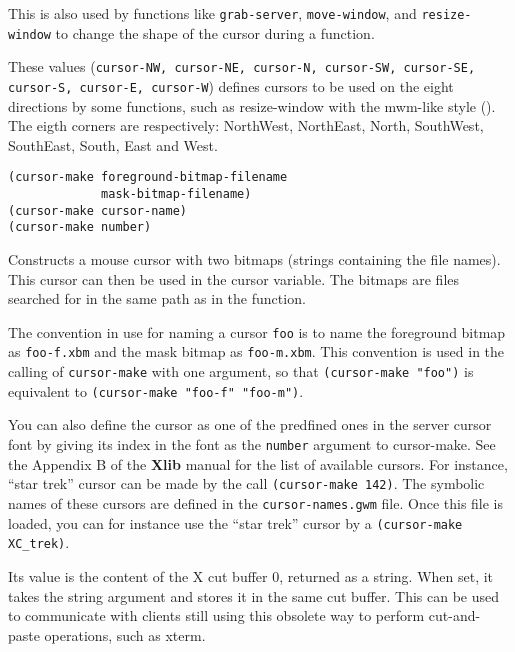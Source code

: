 This is also used by functions like \verb"grab-server", \verb"move-window",
and \verb"resize-window" to change the shape of the cursor during a function.



These values ({\tt cursor-NW, cursor-NE, cursor-N, cursor-SW, cursor-SE,
cursor-S, cursor-E, cursor-W}) defines cursors to be used on the eight
directions by some functions, such as resize-window with the mwm-like style
(). The eigth corners are respectively: NorthWest,
NorthEast, North, SouthWest, SouthEast, South, East and West.

        
{\usagefont\begin{verbatim}
(cursor-make foreground-bitmap-filename 
             mask-bitmap-filename)
(cursor-make cursor-name)
(cursor-make number)
\end{verbatim}}\usageupspace

Constructs a mouse cursor with two bitmaps (strings containing the file
names). This cursor can then be used in the cursor variable. The bitmaps are
files searched for in the same path as in the  function.

\sloppy The convention in use for naming a cursor \verb"foo" is to name the
foreground bitmap as \verb"foo-f.xbm" and the mask bitmap as
\verb"foo-m.xbm". This convention is used in the calling of
\verb"cursor-make" with one argument, so that \verb|(cursor-make "foo")| is
equivalent to \verb|(cursor-make "foo-f" "foo-m")|.

You can also define the cursor as one of the predfined ones in the server
cursor font by giving its index in the font as the \verb"number" argument to
cursor-make. See the Appendix B of the {\bf Xlib} manual for the list of
available cursors. For instance, ``star trek'' cursor can be made by the
call \verb"(cursor-make 142)".
The symbolic names of these cursors are defined in the \verb"cursor-names.gwm"
file. Once this file is loaded, you can for instance use the ``star trek''
cursor by a \verb"(cursor-make XC_trek)".

        

Its value is the content of the X cut buffer 0, returned as a string.  When
set, it takes the string argument and stores it in the same cut buffer. This
can be used to communicate with clients still using this obsolete way to
perform cut-and-paste operations, such as xterm. 

